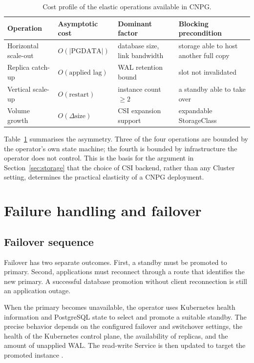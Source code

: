 \documentclass[11pt,a4paper]{article}
\begin{document}
\begin{table}[h]
\centering
\caption{Cost profile of the elastic operations available in CNPG.}
\label{tab:scaling}
\begin{tabular}{@{}>{\raggedright\arraybackslash}p{2.7cm}>{\raggedright\arraybackslash}p{2.6cm}>{\raggedright\arraybackslash}p{3.5cm}>{\raggedright\arraybackslash}p{4.9cm}@{}}
\toprule
Operation & Asymptotic cost & Dominant factor & Blocking precondition \\
\midrule
Horizontal scale-out & $O(\lvert\mathrm{PGDATA}\rvert)$ & database size, link bandwidth & storage able to host another full copy \\
Replica catch-up & $O(\text{applied lag})$ & WAL retention bound & slot not invalidated \\
Vertical scale-up & $O(\text{restart})$ & instance count $\geq 2$ & a standby able to take over \\
Volume growth & $O(\Delta\text{size})$ & CSI expansion support & expandable StorageClass \\
\bottomrule
\end{tabular}
\end{table}

Table~\ref{tab:scaling} summarises the asymmetry. Three of the four operations are bounded by the operator's own state machine; the fourth is bounded by infrastructure the operator does not control. This is the basis for the argument in Section~\ref{sec:storage} that the choice of CSI backend, rather than any Cluster setting, determines the practical elasticity of a CNPG deployment.

\section{Failure handling and failover}

\subsection{Failover sequence}

Failover has two separate outcomes. First, a standby must be promoted to primary. Second, applications must reconnect through a route that identifies the new primary. A successful database promotion without client reconnection is still an application outage.

When the primary becomes unavailable, the operator uses Kubernetes health information and PostgreSQL state to select and promote a suitable standby. The precise behavior depends on the configured failover and switchover settings, the health of the Kubernetes control plane, the availability of replicas, and the amount of unapplied WAL. The read-write Service is then updated to target the promoted instance \cite{cnpg-instance-manager,cnpg-architecture}.
\end{document}
